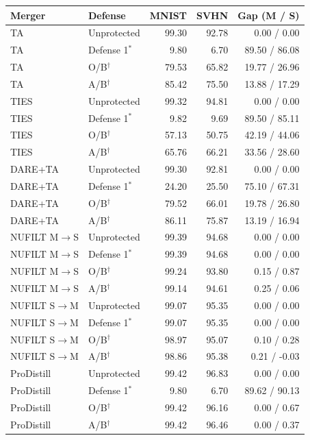 \begin{tabular}{llrrr}
\toprule
Merger & Defense & MNIST & SVHN & Gap (M / S) \\
\midrule
TA & Unprotected & 99.30 & 92.78 & 0.00 / 0.00 \\
TA & Defense 1$^{*}$ & 9.80 & 6.70 & 89.50 / 86.08 \\
TA & O/B$^{\dagger}$ & 79.53 & 65.82 & 19.77 / 26.96 \\
TA & A/B$^{\dagger}$ & 85.42 & 75.50 & 13.88 / 17.29 \\
TIES & Unprotected & 99.32 & 94.81 & 0.00 / 0.00 \\
TIES & Defense 1$^{*}$ & 9.82 & 9.69 & 89.50 / 85.11 \\
TIES & O/B$^{\dagger}$ & 57.13 & 50.75 & 42.19 / 44.06 \\
TIES & A/B$^{\dagger}$ & 65.76 & 66.21 & 33.56 / 28.60 \\
DARE+TA & Unprotected & 99.30 & 92.81 & 0.00 / 0.00 \\
DARE+TA & Defense 1$^{*}$ & 24.20 & 25.50 & 75.10 / 67.31 \\
DARE+TA & O/B$^{\dagger}$ & 79.52 & 66.01 & 19.78 / 26.80 \\
DARE+TA & A/B$^{\dagger}$ & 86.11 & 75.87 & 13.19 / 16.94 \\
NUFILT M$\to$S & Unprotected & 99.39 & 94.68 & 0.00 / 0.00 \\
NUFILT M$\to$S & Defense 1$^{*}$ & 99.39 & 94.68 & 0.00 / 0.00 \\
NUFILT M$\to$S & O/B$^{\dagger}$ & 99.24 & 93.80 & 0.15 / 0.87 \\
NUFILT M$\to$S & A/B$^{\dagger}$ & 99.14 & 94.61 & 0.25 / 0.06 \\
NUFILT S$\to$M & Unprotected & 99.07 & 95.35 & 0.00 / 0.00 \\
NUFILT S$\to$M & Defense 1$^{*}$ & 99.07 & 95.35 & 0.00 / 0.00 \\
NUFILT S$\to$M & O/B$^{\dagger}$ & 98.97 & 95.07 & 0.10 / 0.28 \\
NUFILT S$\to$M & A/B$^{\dagger}$ & 98.86 & 95.38 & 0.21 / -0.03 \\
ProDistill & Unprotected & 99.42 & 96.83 & 0.00 / 0.00 \\
ProDistill & Defense 1$^{*}$ & 9.80 & 6.70 & 89.62 / 90.13 \\
ProDistill & O/B$^{\dagger}$ & 99.42 & 96.16 & 0.00 / 0.67 \\
ProDistill & A/B$^{\dagger}$ & 99.42 & 96.46 & 0.00 / 0.37 \\
\bottomrule
\end{tabular}
